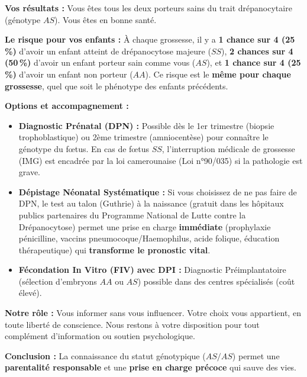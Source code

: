 \documentclass[11pt]{article}
\begin{document}
\begin{exoresolu}
\textbf{Vos résultats :} Vous êtes tous les deux porteurs sains du trait drépanocytaire (génotype $AS$). Vous êtes en bonne santé.

\textbf{Le risque pour vos enfants :} À chaque grossesse, il y a \textbf{1 chance sur 4 (\num{25}\,\%)} d'avoir un enfant atteint de drépanocytose majeure ($SS$), \textbf{2 chances sur 4 (\num{50}\,\%)} d'avoir un enfant porteur sain comme vous ($AS$), et \textbf{1 chance sur 4 (\num{25}\,\%)} d'avoir un enfant non porteur ($AA$). Ce risque est le \textbf{même pour chaque grossesse}, quel que soit le phénotype des enfants précédents.

\textbf{Options et accompagnement :}
\begin{itemize}
    \item \textbf{Diagnostic Prénatal (DPN) :} Possible dès le 1er trimestre (biopsie trophoblastique) ou 2ème trimestre (amniocentèse) pour connaître le génotype du fœtus. En cas de fœtus $SS$, l'interruption médicale de grossesse (IMG) est encadrée par la loi camerounaise (Loi n°90/035) si la pathologie est grave.
    \item \textbf{Dépistage Néonatal Systématique :} Si vous choisissez de ne pas faire de DPN, le test au talon (Guthrie) à la naissance (gratuit dans les hôpitaux publics partenaires du Programme National de Lutte contre la Drépanocytose) permet une prise en charge \textbf{immédiate} (prophylaxie pénicilline, vaccins pneumocoque/Haemophilus, acide folique, éducation thérapeutique) qui \textbf{transforme le pronostic vital}.
    \item \textbf{Fécondation In Vitro (FIV) avec DPI :} Diagnostic Préimplantatoire (sélection d'embryons $AA$ ou $AS$) possible dans des centres spécialisés (coût élevé).
\end{itemize}

\textbf{Notre rôle :} Vous informer sans vous influencer. Votre choix vous appartient, en toute liberté de conscience. Nous restons à votre disposition pour tout complément d'information ou soutien psychologique. \fg

\textbf{Conclusion :} La connaissance du statut génotypique ($AS/AS$) permet une \textbf{parentalité responsable} et une \textbf{prise en charge précoce} qui sauve des vies.
\end{exoresolu}
\end{document}
